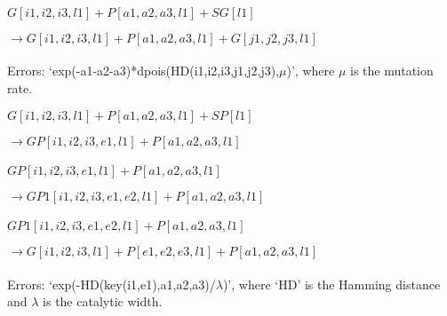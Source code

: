 \documentclass{beamer}
\begin{document}







\begin{frame}
\begin{center}

$G[i1,i2,i3,l1] + P[a1,a2,a3,l1] + SG[l1]$
 
$\xrightarrow[]{} G[i1,i2,i3,l1] + P[a1,a2,a3,l1] + G[j1,j2,j3,l1]$
\end{center}

\vspace{3mm}
Errors: `exp(-a1-a2-a3)*dpois(HD({i1,i2,i3},{j1,j2,j3}),$\mu$)', where $\mu$ is the mutation rate.

\end{frame}

\begin{frame}
\begin{center}

$G[i1,i2,i3,l1] + P[a1,a2,a3,l1] + SP[l1]$

$\xrightarrow[]{} GP[i1,i2,i3,e1,l1] + P[a1,a2,a3,l1]$

\vspace{3mm}
$GP[i1,i2,i3,e1,l1] + P[a1,a2,a3,l1]$

$\xrightarrow[]{} GP1[i1,i2,i3,e1,e2,l1] + P[a1,a2,a3,l1]$

\vspace{3mm}
$GP1[i1,i2,i3,e1,e2,l1] + P[a1,a2,a3,l1]$

$\xrightarrow[]{} G[i1,i2,i3,l1] + P[e1,e2,e3,l1] + P[a1,a2,a3,l1]$
\end{center}

\vspace{3mm}
Errors: `exp(-HD(key(i1,e1),{a1,a2,a3})/$\lambda$)', where `HD' is the Hamming distance and $\lambda$ is the catalytic width. 

\end{frame}
\end{document}
